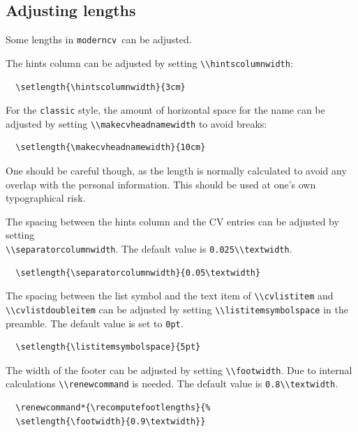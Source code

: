 \documentclass[a4paper, 11pt]{article}
\newcommand{\code}[1]{\lstinline!#1!}
\newcommand{\moderncv}{\code{moderncv}}
\newcommand{\Moderncv}{\moderncv~}
\begin{document}
\subsection{Adjusting lengths}\label{subsection:adjusting:lengths}
Some lengths in \Moderncv can be adjusted.

The hints column can be adjusted by setting \code{\\hintscolumnwidth}:
\begin{lstlisting}
  \setlength{\hintscolumnwidth}{3cm}
\end{lstlisting}

For the \code{classic} style, the amount of horizontal space for the name can be adjusted by setting \code{\\makecvheadnamewidth} to avoid breaks:
\begin{lstlisting}
  \setlength{\makecvheadnamewidth}{10cm}
\end{lstlisting}
One should be careful though, as the length is normally calculated to avoid any overlap with the personal information.
This should be used at one's own typographical risk.

The spacing between the hints column and the CV entries can be adjusted by setting\\
\code{\\separatorcolumnwidth}. The default value is \code{0.025\\textwidth}.
\begin{lstlisting}
  \setlength{\separatorcolumnwidth}{0.05\textwidth}
\end{lstlisting}

The spacing between the list symbol and the text item of \code{\\cvlistitem} and \code{\\cvlistdoubleitem} can be adjusted by setting \code{\\listitemsymbolspace} in the preamble. The default value is set to \code{0pt}.
\begin{lstlisting}
  \setlength{\listitemsymbolspace}{5pt}
\end{lstlisting}

The width of the footer can be adjusted by setting \code{\\footwidth}. Due to internal calculations \code{\\renewcommand} is needed. The default value is \code{0.8\\textwidth}.
\begin{lstlisting}
  \renewcommand*{\recomputefootlengths}{%
  \setlength{\footwidth}{0.9\textwidth}}
\end{lstlisting}
\end{document}
